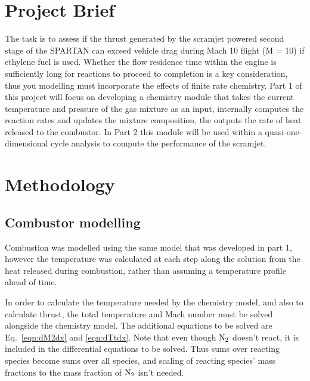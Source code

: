 \documentclass[a4paper]{article}
\begin{document}
\section{Project Brief}
The task is to assess if the thrust generated by the scramjet powered second stage of the SPARTAN can exceed vehicle drag during Mach 10 flight (M = 10) if ethylene fuel is used. Whether the flow residence time within the engine is sufficiently long for reactions to proceed to completion is a key consideration, thus you modelling must incorporate the effects of finite rate chemistry. Part 1 of this project will focus on developing a chemistry module that takes the current temperature and pressure of the gas mixture as an input, internally computes the reaction rates and updates the mixture composition, the outputs the rate of heat released to the combustor. In Part 2 this module will be used within a quasi-one-dimensional cycle analysis to compute the performance of the scramjet.

\section{Methodology}\label{sec:methodology}

\subsection{Combustor modelling}
Combustion was modelled using the same model that was developed in part 1, however the temperature was calculated at each step along the solution from the heat released during combustion, rather than assuming a temperature profile ahead of time.

In order to calculate the temperature needed by the chemistry model, and also to calculate thrust, the total temperature and Mach number must be solved alongside the chemistry model. The additional equations to be solved are Eq.~\ref{eqn:dM2dx} and \ref{eqn:dTtdx}. Note that even though \(\ce{N2}\) doesn't react, it is included in the differential equations to be solved. Thus sums over reacting species become sums over all species, and scaling of reacting species' mass fractions to the mass fraction of \(\ce{N2}\) isn't needed.
\end{document}

